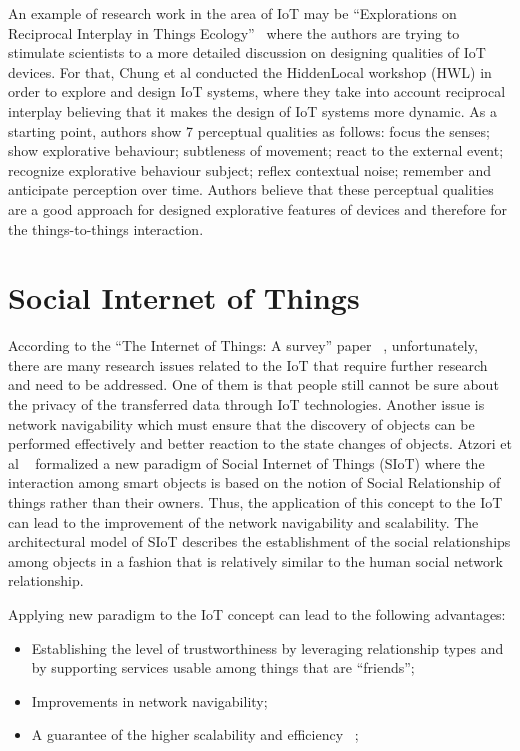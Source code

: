 An example of research work in the area of IoT may be “Explorations on Reciprocal
Interplay in Things Ecology”~\cite{chung2018explorations} where the authors are trying to
stimulate scientists to a more detailed discussion on designing qualities of IoT devices.
For that, Chung et al conducted the HiddenLocal workshop (HWL) in order to explore and design
IoT systems, where they take into account reciprocal interplay believing that it makes the
design of IoT systems more dynamic.
As a starting point, authors show 7 perceptual qualities as follows: focus the senses;
show explorative behaviour;
subtleness of movement;
react to the external event;
recognize explorative behaviour subject;
reflex contextual noise;
remember and anticipate perception over time.
Authors believe that these perceptual qualities are a good approach for designed explorative
features of devices and therefore for the things-to-things interaction.

\section{Social Internet of Things}
\label{sec:Social Internet of Things}
According to the “The Internet of Things: A survey” paper ~\cite{atzori2010internet},
unfortunately, there are many research issues related to the IoT that require further
research and need to be addressed.
One of them is that people still cannot be sure about the privacy of the transferred data
through IoT technologies.
Another issue is network navigability which must ensure that the discovery of objects can be
performed effectively and better reaction to the state changes of objects.
Atzori et al ~\cite{atzori2011siot} formalized a new paradigm of Social Internet of Things (SIoT)
where the interaction among smart objects is based on the notion of Social
Relationship of things rather than their owners.
Thus, the application of this concept to the IoT can lead to the improvement
of the network navigability and scalability.
The architectural model of SIoT describes the establishment of the social relationships
among objects in a fashion that is relatively similar to the human social network relationship.

Applying new paradigm to the IoT concept can lead to the following advantages:
\begin{itemize}
  \item Establishing the level of trustworthiness by leveraging relationship types and by
        supporting services usable among things that are “friends”;
  \item Improvements in network navigability;
  \item A guarantee of the higher scalability and efficiency ~\cite{atzori2012social};
\end{itemize}

